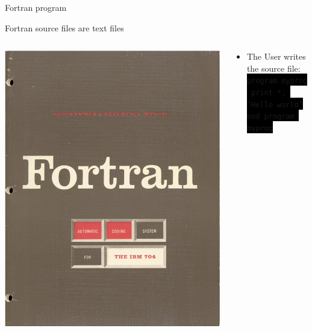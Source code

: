 \documentclass[unknownkeysallowed, 10pt, a4 paper, handout]{beamer}
\newcommand{\code}[1]{\colorbox{black}{\color{green}\texttt{#1}}}
\begin{document}
\begin{frame}[label=Fortran]{Fortran program}
  \begin{center}
  \Large{Fortran source files are text files}
  \end{center}
  \begin{columns}[T]
    \begin{column}{.23\textwidth}
      \vspace{30pt}
      \includegraphics[scale=0.15]{pics/Fortran_acs_cover.jpeg}
    \end{column}
    \hfill
    \begin{column}{.76\textwidth}
      \begin{itemize}
        \item \normalsize{The User writes the source file:} \\
          \footnotesize{
          \code{program myprog} \\
          \code{  print *, 'Hello world'} \\
          \code{end program myprog}
}
\end{itemize}
\end{column}
\end{columns}
\end{frame}
\end{document}
